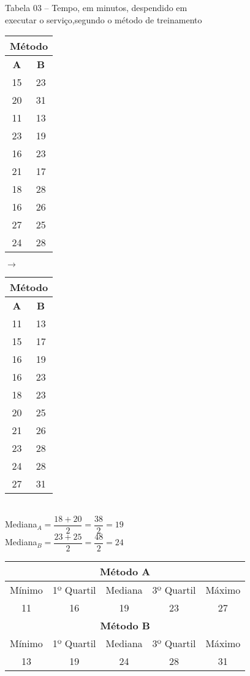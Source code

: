 \documentclass[12pt,a4paper]{article}
\begin{document}
	\begin{center}
		\small{Tabela 03 – Tempo, em minutos, despendido em\\ executar o serviço,segundo o método de treinamento}\\
		\begin{tabular}{|c|c|} \hline
			\multicolumn{2}{|c|}{\textbf{Método}}\\ \hline
			\textbf{A} & \textbf{B}\\ \hline
			15 & 23\\ \hline
			20 & 31\\ \hline
			11 & 13\\ \hline
			23 & 19\\ \hline
			16 & 23\\ \hline
			21 & 17\\ \hline 
			18 & 28\\ \hline
			16 & 26\\ \hline
			27 & 25\\ \hline
			24 & 28\\ \hline
		\end{tabular}
		\hspace{1cm}
		$\rightarrow$
		\hspace{1cm}
		\begin{tabular}{|c|c|} \hline
			\multicolumn{2}{|c|}{\textbf{Método}}\\ \hline
			\textbf{A} & \textbf{B}\\ \hline
			11 & 13\\ \hline
			15 & 17\\ \hline
			16 & 19\\ \hline
			16 & 23\\ \hline
			18 & 23\\ \hline
			20 & 25\\ \hline 
			21 & 26\\ \hline
			23 & 28\\ \hline
			24 & 28\\ \hline
			27 & 31\\ \hline
		\end{tabular}
		\vspace{0.5cm}\\
		Mediana$_{A} = \dfrac{18 + 20}{2} = \dfrac{38}{2} = 19$
		\vspace{0.5cm}\\
		Mediana$_{B} = \dfrac{23 + 25}{2} = \dfrac{48}{2} = 24$
		\vspace{0.5cm}\\
		\begin{tabular}{|c|c|c|c|c|} \hline
			\multicolumn{5}{|c|}{\textbf{Método A}}\\ \hline
			Mínimo & 1º Quartil & Mediana & 3º Quartil & Máximo\\ \hline
			11 & 16 & 19 & 23 & 27\\ \hline
			\multicolumn{5}{|c|}{\textbf{Método B}}\\ \hline
			Mínimo & 1º Quartil & Mediana & 3º Quartil & Máximo\\ \hline
			13 & 19 & 24 & 28 & 31\\ \hline
		\end{tabular}
	\end{center}
\end{document}
